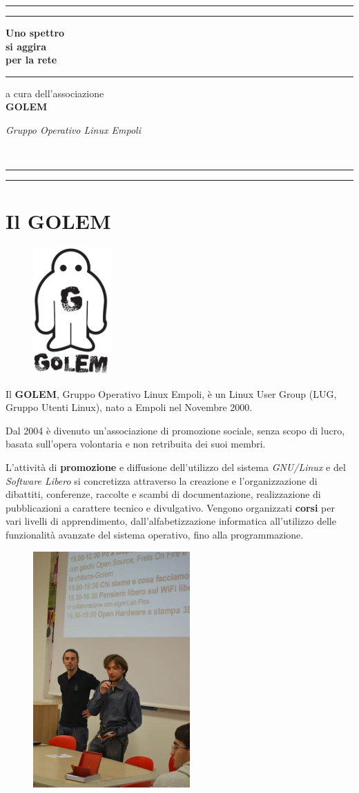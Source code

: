 \documentclass[a4paper, 12pt]{extarticle}
\newcommand*{\plogo}{\fbox{$\mathcal{GOLEM}$}}
\newcommand*{\titleAT}{\begingroup %
\newlength{\drop} %
\drop=0.1\textheight %

\rule{\textwidth}{1pt}\par %
\vspace{2pt}\vspace{-\baselineskip} %
\rule{\textwidth}{0.4pt}\par %

\vspace{\drop} %
\centering %
{
{\Huge \textbf{Uno spettro}}\\[0.5\baselineskip] %
{\Huge \textbf{si aggira}}\\[0.5\baselineskip] %
{\Huge \textbf{per la rete}}} %

\vspace{0.25\drop} %
\rule{0.3\textwidth}{0.4pt}\par %
\vspace{\drop} %

{\Large a cura dell'associazione
\\
\textsc{\textbf{GOLEM}}

\textit{Gruppo Operativo Linux Empoli}} %

\vfill %
{\large
{\plogo}}\\[0.5\baselineskip] %

\vspace*{\drop} %

\rule{\textwidth}{0.4pt}\par %
\vspace{2pt}\vspace{-\baselineskip} %
\rule{\textwidth}{1pt}\par %
\endgroup}
\begin{document}
\titleAT
\clearpage
\thispagestyle{empty}
\mbox{}
\clearpage

\section*{Il GOLEM}

\begin{figure}
\includegraphics[width=3cm]{img/opuscolo-1.png}
\end{figure}

Il \textbf{GOLEM}, Gruppo Operativo Linux Empoli, è un Linux User Group
(LUG, Gruppo Utenti Linux), nato a Empoli nel Novembre 2000.

Dal 2004 è divenuto un'associazione di promozione sociale, senza scopo
di lucro, basata sull'opera volontaria e non retribuita dei suoi
membri.

L'attività di \textbf{promozione} e diffusione dell'utilizzo del
sistema \textit{GNU/Linux} e del \textit{Software Libero} si
concretizza attraverso la creazione e l'organizzazione di dibattiti,
conferenze, raccolte e scambi di documentazione, realizzazione di
pubblicazioni a carattere tecnico e divulgativo. Vengono organizzati
\textbf{corsi} per vari livelli di apprendimento, dall'alfabetizzazione
informatica all'utilizzo delle funzionalità avanzate del sistema
operativo, fino alla programmazione.

\begin{figure}
  \includegraphics[width=6cm]{img/opuscolo-2.jpg}
\end{figure}
\end{document}
